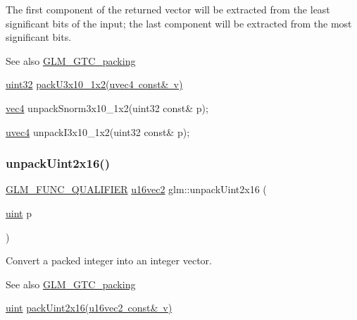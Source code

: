 The first component of the returned vector will be extracted from the least significant bits of the input; the last component will be extracted from the most significant bits.

\begin{DoxySeeAlso}{See also}
\mbox{\hyperlink{group__gtc__packing}{G\+L\+M\+\_\+\+G\+T\+C\+\_\+packing}} 

\mbox{\hyperlink{group__gtc__type__precision_ga202b6a53c105fcb7e531f9b443518451}{uint32}} \mbox{\hyperlink{group__gtc__packing_gaf656d8862628f96b20de7a36eaa1fe56}{pack\+U3x10\+\_\+1x2(uvec4 const\& v)}} 

\mbox{\hyperlink{group__core__types_ga5881b1b022d7fd1b7218f5916532dd02}{vec4}} unpack\+Snorm3x10\+\_\+1x2(uint32 const\& p); 

\mbox{\hyperlink{group__core__types_ga1c426d19627b32b14f0089f7f4ba7b1d}{uvec4}} unpack\+I3x10\+\_\+1x2(uint32 const\& p); 
\end{DoxySeeAlso}
\mbox{\label{group__gtc__packing_ga7778efa924e6efc386cb9f373bb06b72}} 
\subsubsection{\texorpdfstring{unpack\+Uint2x16()}{unpackUint2x16()}}
{\footnotesize\ttfamily \mbox{\hyperlink{setup_8hpp_a33fdea6f91c5f834105f7415e2a64407}{G\+L\+M\+\_\+\+F\+U\+N\+C\+\_\+\+Q\+U\+A\+L\+I\+F\+I\+ER}} \mbox{\hyperlink{group__gtc__type__precision_ga50bd2ceeb100a187e7c46f135269a0ec}{u16vec2}} glm\+::unpack\+Uint2x16 (\begin{DoxyParamCaption}\item[{\mbox{\hyperlink{group__core__precision_ga4fd29415871152bfb5abd588334147c8}{uint}}}]{p }\end{DoxyParamCaption})}

Convert a packed integer into an integer vector.

\begin{DoxySeeAlso}{See also}
\mbox{\hyperlink{group__gtc__packing}{G\+L\+M\+\_\+\+G\+T\+C\+\_\+packing}} 

\mbox{\hyperlink{group__core__precision_ga4fd29415871152bfb5abd588334147c8}{uint}} \mbox{\hyperlink{group__gtc__packing_gad5ca2e64edae3c233657c9fb0d18a9c9}{pack\+Uint2x16(u16vec2 const\& v)}} 
\end{DoxySeeAlso}
\mbox{\label{group__gtc__packing_gab211ea5f8cf86f00efa4fd53cb302c82}} 
